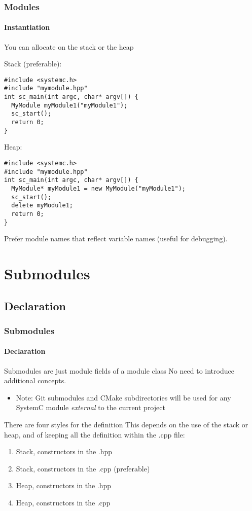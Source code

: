 \begin{frame}[fragile]
\frametitle{Modules}
\framesubtitle{Instantiation}

\begin{block}{You can allocate on the stack or the heap}
{\scriptsize
Stack (preferable):
\vspace{-0.5em}
\begin{verbatim}
#include <systemc.h>
#include "mymodule.hpp"
int sc_main(int argc, char* argv[]) {
  MyModule myModule1("myModule1");
  sc_start();
  return 0;
}
\end{verbatim}
Heap:
\begin{verbatim}
#include <systemc.h>
#include "mymodule.hpp"
int sc_main(int argc, char* argv[]) {
  MyModule* myModule1 = new MyModule("myModule1");
  sc_start();
  delete myModule1;
  return 0;
}
\end{verbatim}
\vspace{-0.8em}
Prefer module names that reflect variable names (useful for debugging).
}
\end{block}
\end{frame}

\section{Submodules}

\subsection{Declaration}

\begin{frame}
\frametitle{Submodules}
\framesubtitle{Declaration}

\begin{block}{Submodules are just module fields of a module class}
No need to introduce additional concepts.
\begin{itemize}
\item Note: Git submodules and CMake subdirectories will be used for any SystemC module {\em external} to the current project
\end{itemize}
\end{block}
\pause
\begin{block}{There are four styles for the definition}
This depends on the use of the stack or heap, and of keeping all the definition within the .cpp file:
\begin{enumerate}
\item Stack, constructors in the .hpp
\item Stack, constructors in the .cpp (preferable)
\item Heap, constructors in the .hpp
\item Heap, constructors in the .cpp
\end{enumerate}
\end{block}
\end{frame}

